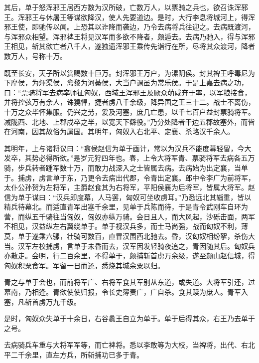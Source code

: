 \documentclass[12pt,UTF8]{ctexbook}
\begin{document}
其后，单于怒浑邪王居西方数为汉所破，亡数万人，以票骑之兵也，欲召诛浑邪王。浑邪王与休屠王等谋欲降汉，使人先要道边。是时，大行李息将城河上，得浑邪王使，即驰传以闻。上恐其以诈降而袭边，乃令去病将兵往迎之。去病既渡河，与浑邪众相望。浑邪裨王将见汉军而多欲不降者，颇遁去。去病乃驰入，得与浑邪王相见，斩其欲亡者八千人，遂独遗浑邪王乘传先诣行在所，尽将其众渡河，降者数万人，号称十万。



既至长安，天子所以赏赐数十巨万。封浑邪王万户，为漯阴侯。封其裨王呼毒尼为下摩侯，为煇渠侯，禽黎为河綦侯，大当户调虽为常乐侯。于是上嘉去病之功，曰：“票骑将军去病率师征匈奴，西域王浑邪王及厥众萌咸奔于率，以军粮接食，并将控弦万有余人，诛獟悍，捷者虏八千余级，降异国之王三十二。战士不离伤，十万之众毕怀集服。仍兴之劳，爰及河塞，庶几亡患，以千七百户益封票骑将军。减陇西、北地、上郡戍卒之半，以宽天下繇役。”乃分处降者干边五郡故塞外，而皆在河南，因其故俗为属国。其明年，匈奴入右北平、定襄、杀略汉千余人。



其明年，上与诸将议曰：“翕侯赵信为单于画计，常以为汉兵不能度幕轻留，今大发卒，其势必得所欲。”是岁元狩四年也。春，上令大将军青、票骑将军去病各五万骑，步兵转者踵军数十万，而敢力战深入之士皆属去病。去病始为出定襄，当单于。捕虏，虏言单于东，乃更令去病出代郡，令青出定襄。郎中令李广为前将军，太仆公孙贺为左将军，主爵赵食其为右将军，平阳侯襄为后将军，皆属大将军。赵信为单于谋曰：“汉兵即度幕，人马罢，匈奴可坐收虏耳。”乃悉远北其辎重，皆以精兵待幕北。而适直青军出塞千余里，见单于兵陈而待，于是青令武刚车自环为营，而纵五千骑往当匈奴，匈奴亦纵万骑。会日且人，而大风起，沙砾击面，两军不相见，汉益纵左右翼绕单于。单于视汉兵多，而士马尚强，战而匈奴不利，薄莫，单于遂乘六骡，壮骑可数百，直冒汉围西北驰去。昏，汉匈奴相纷挐，杀伤大当。汉军左校捕虏，言单于未昏而去，汉军因发轻骑夜追之，青因随其后。匈奴兵亦散走。会明，行二百余里，不得单于，颇捕斩首虏万余级，遂至颜山赵信城，得匈奴积粟食军。军留一日而还，悉烧其城余粟以归。



青之与单于会也，而前将军广、右将军食其军别从东道，或失道。大将军引还，过幕南，乃相逢。青欲使使归报，令长史簿责广，广自杀。食其赎为庶人。青军入塞，凡斩首虏万九千级。



是时，匈奴众失单于十余日，右谷蠡王自立为单于。单于后得其众，右王乃去单于之号。



去病骑兵车重与大将军军等，而亡裨将。悉以李敢等为大校，当裨将，出代、右北平二千余里，直左方兵，所斩捕功已多于青。
\end{document}

